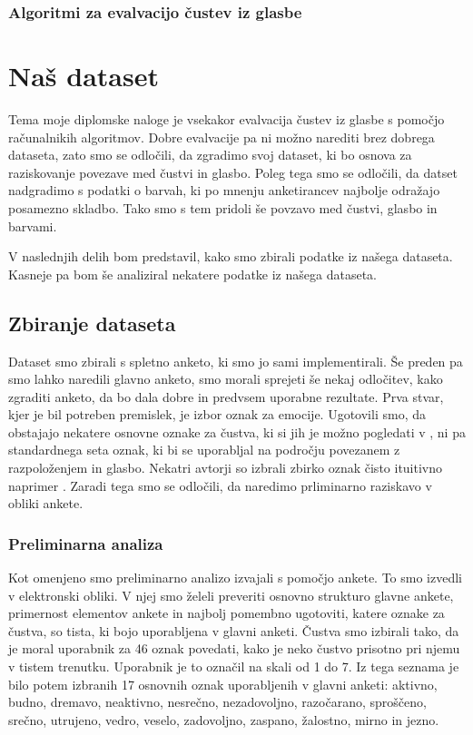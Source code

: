 \documentclass[a4paper, 12pt]{book}
\begin{document}
{\subsection{Algoritmi za evalvacijo čustev iz glasbe} 



\chapter{Naš dataset}

Tema moje diplomske naloge je vsekakor evalvacija čustev iz glasbe s pomočjo računalnikih algoritmov. Dobre evalvacije pa ni možno narediti brez dobrega dataseta, zato smo se odločili, da zgradimo svoj dataset, ki bo osnova za raziskovanje povezave med čustvi in glasbo. Poleg tega smo se odločili, da datset nadgradimo s podatki o barvah, ki po mnenju anketirancev najbolje odražajo posamezno skladbo. Tako smo s tem pridoli še povzavo med čustvi, glasbo in barvami.

V naslednjih delih bom predstavil, kako smo zbirali podatke iz našega dataseta. Kasneje pa bom še analiziral nekatere podatke iz našega dataseta.

\section{Zbiranje dataseta}

Dataset smo zbirali s spletno anketo, ki smo jo sami implementirali. Še preden pa smo lahko naredili glavno anketo, smo morali sprejeti še nekaj odločitev, kako zgraditi anketo, da bo dala dobre in predvsem uporabne rezultate. Prva stvar, kjer je bil potreben premislek, je izbor oznak za emocije. Ugotovili smo, da obstajajo nekatere osnovne oznake za čustva, ki si jih je možno pogledati v \cite{dalgleish1999handbook}, ni pa standardnega seta oznak, ki bi se uporabljal na področju povezanem z razpoloženjem in glasbo. Nekatri avtorji so izbrali zbirko oznak čisto ituitivno naprimer \cite{wu2013spectral}. Zaradi tega smo se odločili, da naredimo prliminarno raziskavo v obliki ankete. 

\subsection{Preliminarna analiza}

Kot omenjeno smo preliminarno analizo izvajali s pomočjo ankete. To smo izvedli v elektronski obliki. V njej smo želeli preveriti osnovno strukturo glavne ankete, primernost elementov ankete in najbolj pomembno ugotoviti, katere oznake za čustva, so tista, ki bojo uporabljena v glavni anketi. Čustva smo izbirali tako, da je moral uporabnik za 46 oznak povedati, kako je neko čustvo prisotno pri njemu v tistem trenutku. Uporabnik je to označil na skali od 1 do 7. Iz tega seznama je bilo potem izbranih 17 osnovnih oznak uporabljenih v glavni anketi: aktivno, budno, dremavo, neaktivno, nesrečno, nezadovoljno, razočarano, sproščeno, srečno, utrujeno, vedro, veselo, zadovoljno, zaspano, žalostno, mirno in jezno.

}
\end{document}
